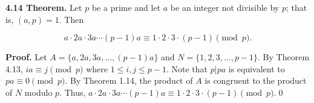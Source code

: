 \documentclass[12pt]{article}
\begin{document}
\noindent\textbf{4.14 Theorem.} Let $p$ be a prime and let $a$ be an integer not divisible by $p$; that is, $(a,p)=1$. Then 

\begin{equation*}
a\cdot 2a\cdot 3a\cdots (p-1)a\equiv 1\cdot 2\cdot 3\cdot (p-1)\pmod p. 
\end{equation*}

\bigskip

\noindent\textbf{Proof.} Let $A=\{a,2a,3a,...,(p-1)a\}$ and $N=\{1,2,3,...,p-1\}$. By Theorem 4.13, $ia\equiv j\pmod p$ where $1\leq i,j \leq p-1$. Note that $p|pa$ is equivalent to $pa\equiv 0\pmod p$. By Theorem 1.14, the product of $A$ is congruent to the product of $N$ modulo $p$. Thus, $a\cdot 2a\cdot 3a\cdots (p-1)a\equiv 1\cdot 2\cdot 3\cdot (p-1)\pmod p$.\qed
\end{document}
